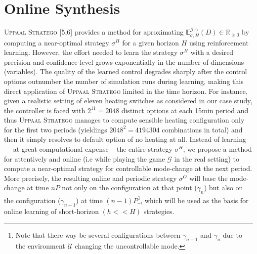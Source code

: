   \section{Online Synthesis}
    \textsc{Uppaal Stratego} [5,6] provides a method for aproximating 
    $\mathbb{E}^{\mathcal{G},\gamma}_{\sigma,H}(D) \in \mathbb{R}_{\geqslant 0}$
    by computing a near-optimal strategy $\sigma^H$ for a given horizon $H$ using 
    reinforcement learning. However, the effort needed to learn the strategy  
    $\sigma^H$ with a desired precision and confidence-level grows exponentially
    in the number of dimensions (variables). The quality of the learned control 
    degrades sharply after the control options outnumber the number of simulation
    runs during learning, making this direct application of \textsc{Uppaal Stratego}
    limited in the time horizon. For instance, given a realistic setting of eleven 
    heating switches as considered in our case study, the controller is faced with  
    $2^11=2048$ distinct options at each 15min period and thus \textsc{Uppaal Stratego}
    manages to compute sensible heating configuration only for the first two periods 
    (yieldings $2048^2=4194304$ combinations in total) and then it simply resolves 
    to default option of no heating at all.
    Instead of learning --- at great computational expense -- the   entire strategy
    $\sigma^H$, we propose a method for attentively and online (i.e while playing
    the game $\mathcal{G}$ in the real setting) to compute a near-optimal strategy for 
    controllable mode-change at the next period. More precisely, the resulting online 
    and periodic strategy $\sigma^O$ will base the mode-change at time $nP$ not only
    on the configuration at that point ($\gamma_n$) but also on the configuration
    ($\gamma_{n-1}$) at time $(n-1)P$\footnote{Note that there way be several configurations
    between $\gamma_{n-1}$ and $\gamma_n$ due to the environment $\mathcal{U}$ changing
    the uncontrollable mode.}, which will be used as the basis for online
    learning of short-horizon $(h << H)$ strategies.


